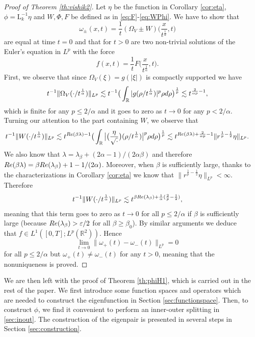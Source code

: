 \documentclass[11pt,reqno]{amsproc}
\def\dd{{\rm d}}
\def\eps{\varepsilon}
\def\RR {\mathbb{R}}
\def\Re{{\rm Re}}
\newcommand{\rmL}{\mathrm{L}}
\theoremstyle{definition}
\theoremstyle{definition}
\numberwithin{equation}{section}
\begin{document}
\begin{proof}[Proof of Theorem \ref{th:vishik2}]
    Let $\eta$ be the function in Corollary \ref{cor:eta}, $\phi=\rmL_k^{-1}\eta$ and $W,\Phi,F$ be defined as in \cref{eq:F}-\cref{eq:WPhi}. We have to show that 
    \begin{equation}
        \omega_{\pm}(x,t)=\frac{1}{t}(\Omega_V\pm W)\big(\frac{x}{t^\frac{1}{\alpha}},t\big)
    \end{equation}
    are equal at time $t=0$ and that for $t>0$ are two non-trivial solutions of the Euler's equation in $L^p$ with the force
    \begin{equation}
        f(x,t)=\frac{1}{t}F\big(\frac{x}{t^\frac{1}{\alpha}},t\big).
    \end{equation}
    First, we observe that since $\Omega_V(\xi)=g(|\xi|)$ is compactly supported we have 
    \begin{equation}
t^{-1}\|\Omega_V(\cdot/t^{\frac{1}{\alpha}})\|_{L^p}\lesssim t^{-1}\big (\int_\RR |g(\rho/t^{\frac{1}{\alpha}})|^p \rho \dd \rho \big)^{\frac{1}{p}}\lesssim t^{\frac{2}{\alpha p}-1}, \end{equation}
which is finite for any $p\leq 2/\alpha$ and it goes to zero as $t\to0$ for any $p<2/\alpha$. Turning our attention to the part containing $W$, we observe that
    \begin{equation}
t^{-1}\|W(\cdot/t^{\frac{1}{\alpha}})\|_{L^p}\lesssim t^{\Re(\beta \lambda)-1}\big (\int_\RR \big|\big(\frac{\eta}{\sqrt{\cdot}}\big)(\rho/t^{\frac{1}{\alpha}})\big|^p \rho \dd \rho \big)^{\frac{1}{p}}\lesssim t^{\Re(\beta\lambda)+\frac{2}{\alpha p}-1}\|r^{\frac{1}{p}-\frac12}\eta\|_{L^p}.
\end{equation}
We also know that $\lambda=\lambda_\beta+(2\alpha-1)/(2\alpha\beta)$ and therefore $\Re(\beta \lambda)=\beta \Re(\lambda_\beta)+1-1/(2\alpha)$. Moreover, when  $\beta$ is sufficiently large, thanks to the characterizations in Corollary \ref{cor:eta} we know that $\|r^{\frac{1}{p}-\frac12}\eta\|_{L^p}<\infty$. Therefore 
 \begin{equation}
t^{-1}\|W(\cdot/t^{\frac{1}{\alpha}})\|_{L^p}\lesssim t^{\beta\Re(\lambda_\beta)+\frac{1}{\alpha}(\frac{2}{ p}-\frac{1}{2})},
\end{equation}
meaning that this term goes to zero as $t\to 0$  for all $p\leq 2/\alpha$ if $\beta$ is sufficiently large (because $\Re(\lambda_\beta)>\eps/2$ for all $\beta\geq \beta_0$). By similar arguments we deduce that $f\in L^1([0,T];L^p(\RR^2))$. Hence
\begin{equation}
    \lim_{t\to 0}\|\omega_+(t)-\omega_-(t)\|_{L^p}=0
\end{equation}
for all $p\leq2/\alpha$ but $\omega_+(t)\neq \omega_-(t)$ for any $t>0$, meaning that the nonuniqueness is proved.
\end{proof}
We are then left with the proof of Theorem \ref{th:phiH1}, which is carried out in the rest of the paper. We first introduce some function spaces and operators which are needed to construct the eigenfunction in Section \ref{sec:functionspace}. Then, to construct $\phi$, we find it convenient to perform an inner-outer splitting in \cref{sec:inout}. The construction of the eigenpair is presented in several steps in Section \ref{sec:construction}.
\end{document}
